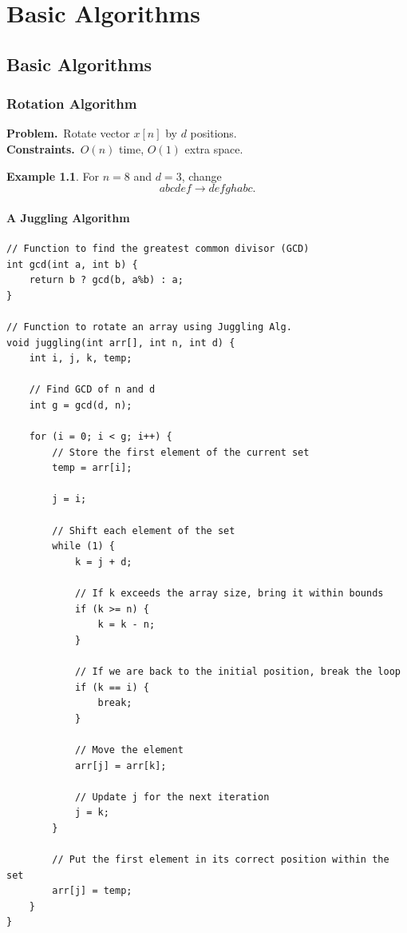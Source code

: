 \documentclass[12pt,openany]{book}
\theoremstyle{definition}
\newtheorem{example}{Example}[chapter]
\begin{document}
	\tableofcontents
	
	\mainmatter
	
	\part{Basic Algorithms}
	
	\chapter{Basic Algorithms}
	\section{Rotation Algorithm}
	\begin{tcolorbox}[colback=white,colframe=lemcolor,arc=5pt,title={\color{white}\bf Rotation}]
		\textbf{Problem.}\ Rotate vector \(x[n]\) by $d$ positions.\\
		\textbf{Constraints.}\ $O(n)$ time, $O(1)$ extra space.
	\end{tcolorbox}
	\begin{example}
		For $n=8$ and $d=3$, change \[
		abcdef\to defghabc.
		\]
	\end{example}

	\newpage
	\subsection{A Juggling Algorithm}
	
	\begin{lstlisting}[style=C, caption={Juggling Rotation Algorithm},captionpos=t]
// Function to find the greatest common divisor (GCD)
int gcd(int a, int b) {
	return b ? gcd(b, a%b) : a;
}

// Function to rotate an array using Juggling Alg.
void juggling(int arr[], int n, int d) {
	int i, j, k, temp;
	
	// Find GCD of n and d
	int g = gcd(d, n);
	
	for (i = 0; i < g; i++) {
		// Store the first element of the current set
		temp = arr[i];
		
		j = i;
		
		// Shift each element of the set
		while (1) {
			k = j + d;
			
			// If k exceeds the array size, bring it within bounds
			if (k >= n) {
				k = k - n;
			}
			
			// If we are back to the initial position, break the loop
			if (k == i) {
				break;
			}
			
			// Move the element
			arr[j] = arr[k];
			
			// Update j for the next iteration
			j = k;
		}
		
		// Put the first element in its correct position within the set
		arr[j] = temp;
	}
}
	\end{lstlisting}
	
\end{document}
